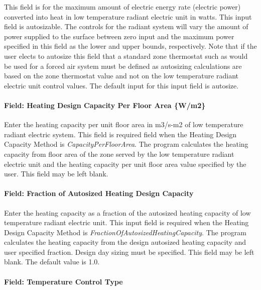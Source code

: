 This field is for the maximum amount of electric energy rate (electric power) converted into heat in low temperature radiant electric unit in watts. This input field is autosizable. The controls for the radiant system will vary the amount of power supplied to the surface between zero input and the maximum power specified in this field as the lower and upper bounds, respectively. Note that if the user elects to autosize this field that a standard zone thermostat such as would be used for a forced air system must be defined as autosizing calculations are based on the zone thermostat value and not on the low temperature radiant electric unit control values. The default input for this input field is autosize.

\paragraph{Field: Heating Design Capacity Per Floor Area \{W/m2\}}\label{field-heating-design-capacity-per-floor-area-wm2-6}

Enter the heating capacity per unit floor area in m3/s-m2 of low temperature radiant electric system. This field is required field when the Heating Design Capacity Method is \emph{CapacityPerFloorArea}. The program calculates the heating capacity from floor area of the zone served by the low temperature radiant electric unit and the heating capacity per unit floor area value specified by the user. This field may be left blank.

\paragraph{Field: Fraction of Autosized Heating Design Capacity}\label{field-fraction-of-autosized-heating-design-capacity-6}

Enter the heating capacity as a fraction of the autosized heating capacity of low temperature radiant electric unit. This input field is required when the Heating Design Capacity Method is \emph{FractionOfAutosizedHeatingCapacity}. The program calculates the heating capacity from the design autosized heating capacity and user specified fraction. Design day sizing must be specified. This field may be left blank. The default value is 1.0.

\paragraph{Field: Temperature Control Type}\label{field-temperature-control-type-2}

